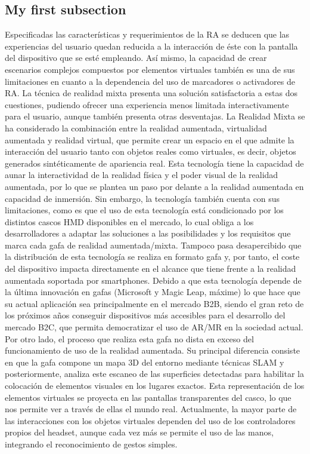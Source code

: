 \subsection{My first subsection}
Especificadas las características y requerimientos de la RA se deducen que las experiencias del usuario quedan reducida a la interacción de éste con la pantalla del dispositivo que se esté empleando. Así mismo, la capacidad de crear escenarios complejos compuestos por elementos virtuales también es una de sus limitaciones en cuanto a la dependencia del uso de marcadores o activadores de RA. La técnica de realidad mixta presenta una solución satisfactoria a estas dos cuestiones, pudiendo ofrecer una experiencia menos limitada interactivamente para el usuario, aunque también presenta otras desventajas.
La Realidad Mixta se ha considerado la combinación entre la realidad aumentada, virtualidad aumentada y realidad virtual, que permite crear un espacio en el que admite la interacción del usuario tanto con objetos reales como virtuales, es decir, objetos generados sintéticamente de apariencia real. Esta tecnología tiene la capacidad de aunar la interactividad de la realidad física y el poder visual de la realidad aumentada, por lo que se plantea un paso por delante a la realidad aumentada en capacidad de inmersión. Sin embargo, la tecnología también cuenta con sus limitaciones, como es que el uso de esta tecnología está condicionado por los distintos cascos HMD disponibles en el mercado, lo cual obliga a los desarrolladores a adaptar las soluciones a las posibilidades y los requisitos que marca cada gafa de realidad aumentada/mixta. Tampoco pasa desapercibido que la distribución de esta tecnología se realiza en formato gafa y, por tanto, el coste del dispositivo impacta directamente en el alcance que tiene frente a la realidad aumentada soportada por smartphones. Debido a que esta tecnología depende de la última innovación en gafas (Microsoft y Magic Leap, máxime) lo que hace que su actual aplicación sea principalmente en el mercado B2B, siendo el gran reto de los próximos años conseguir dispositivos más accesibles para el desarrollo del mercado B2C, que permita democratizar el uso de AR/MR en la sociedad actual.
Por otro lado, el proceso que realiza esta gafa no dista en exceso del funcionamiento de uso de la realidad aumentada. Su principal diferencia consiste en que la gafa compone un mapa 3D del entorno mediante técnicas SLAM y posteriormente, analiza este escaneo de las superficies detectadas para habilitar la colocación de elementos visuales en los lugares exactos. Esta representación de los elementos virtuales se proyecta en las pantallas transparentes del casco, lo que nos permite ver a través de ellas el mundo real. Actualmente, la mayor parte de las interacciones con los objetos virtuales dependen del uso de los controladores propios del headset, aunque cada vez más se permite el uso de las manos, integrando el reconocimiento de gestos simples.
